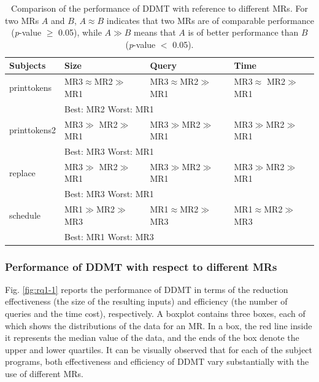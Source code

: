 \begin{table}[!t]
\caption{Comparison of the performance of DDMT with reference to different MRs.
For two MRs $A$ and $B$, $A \approx B$ indicates that two MRs are of comparable performance (\emph{p}-value $\ge$ 0.05), while $A \gg B$ means that $A$ is of better performance than $B$ (\emph{p}-value $<$ 0.05). }%
\centering
\setlength{\tabcolsep}{4pt}  %
\begin{tabular}{@{} p{1.5cm} p{2.2cm} p{2.2cm} p{2.2cm} @{}}%
\toprule
\textbf{Subjects} & \textbf{Size} & \textbf{Query} & \textbf{Time} \\
\midrule
printtokens   & \scriptsize  MR3$\approx$MR2$\gg$MR1 & \scriptsize MR3$\approx$MR2$\gg$MR1 & \scriptsize MR3$\approx$ MR2$\gg$MR1 \\
\addlinespace
              & \multicolumn{3}{l}{\footnotesize Best: MR2 \; Worst: MR1} \\
\midrule
printtokens2  & \scriptsize MR3$\gg$ MR2$\gg$MR1 & \scriptsize MR3$\gg$MR2$\gg$MR1 & \scriptsize MR3$\gg$MR2$\gg$MR1 \\
\addlinespace
              & \multicolumn{3}{l}{\footnotesize Best: MR3 \; Worst: MR1} \\
\midrule
replace       & \scriptsize MR3$\gg$ MR2$\gg$MR1 & \scriptsize MR3$\gg$MR2$\gg$MR1 & \scriptsize MR3$\gg$MR2$\gg$MR1 \\
\addlinespace
              & \multicolumn{3}{l}{\footnotesize Best: MR3 \; Worst: MR1} \\
\midrule
schedule      & \scriptsize MR1$\gg$MR2$\gg$MR3 & \scriptsize MR1$\approx$MR2$\gg$MR3 & \scriptsize MR1$\approx$MR2$\gg$MR3 \\
\addlinespace
              & \multicolumn{3}{l}{\footnotesize Best: MR1 \; Worst: MR3} \\
\bottomrule
\end{tabular}
\label{tab:mr-comp}
\end{table}%

\subsubsection{Performance of DDMT with respect to different MRs}
Fig. \ref{fig:rq1-1} reports the performance of DDMT in terms of
the reduction effectiveness (the size of the resulting inputs) and efficiency (the number of queries and the time cost), respectively.
A boxplot contains three boxes, each of which shows the distributions of the data for an MR.
In a box, the red line inside it represents the median value of the data, and the ends of the box denote the upper and lower quartiles.
It can be visually observed that for each of the subject programs, both effectiveness and efficiency of DDMT vary substantially with the use of different MRs.







